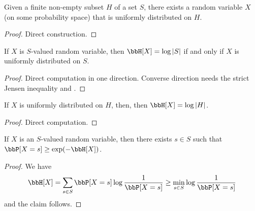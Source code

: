 \begin{lemma}\label{unif-exist}
  \leanok
  Given a finite non-empty subset $H$ of a set $S$, there exists a random variable $X$ (on some probability space) that is uniformly distributed on $H$.
\end{lemma}

\begin{proof}\leanok Direct construction.
\end{proof}


\begin{lemma}\label{uniform-entropy}
  \leanok
  If $X$ is $S$-valued random variable, then $\bbH[X] = \log |S|$ if and only if $X$ is uniformly distributed on $S$.
\end{lemma}

\begin{proof}
  \leanok

  Direct computation in one direction.
  Converse direction needs the strict Jensen inequality and .
\end{proof}

\begin{lemma}\label{uniform-entropy-II}
  \leanok
  If $X$ is uniformly distributed on $H$, then, then $\bbH[X] = \log |H|$.
\end{lemma}

\begin{proof}\leanok Direct computation.
\end{proof}

\begin{lemma}\label{bound-conc}
  \leanok
  If $X$ is an $S$-valued random variable, then there exists $s \in S$ such that $\bbP[X=s] \geq \exp(-\bbH[X])$.
\end{lemma}

\begin{proof}
  \leanok
  We have
  $$ \bbH[X] = \sum_{s \in S} \bbP[X=s] \log \frac{1}{\bbP[X=s]} \geq \min_{s \in S} \log \frac{1}{\bbP[X=s]}$$
  and the claim follows.
\end{proof}

